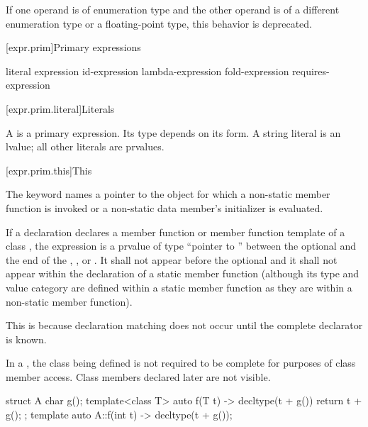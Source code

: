 \pnum
If one operand is of enumeration type
and the other operand is of
a different enumeration type or
a floating-point type,
this behavior is deprecated.

[expr.prim]{Primary expressions}%

\begin{bnf}
\br
    literal\br
    \br
    \terminal{(} expression \terminal{)}\br
    id-expression\br
    lambda-expression\br
    fold-expression\br
    requires-expression
\end{bnf}

[expr.prim.literal]{Literals}

\pnum
A
%
%
is a primary expression.
Its type depends on its form.
A string literal is an lvalue; all other literals are prvalues.

[expr.prim.this]{This}

\pnum
{}%
The keyword  names a pointer to the object for which a non-static member
function is invoked or a non-static data member's
initializer is evaluated.

\pnum
If a declaration declares a member function or member function template of a
class , the expression  is a prvalue of type ``pointer to
 '' between the optional
 and the end of the ,
, or . It shall not appear
before the optional  and it shall not appear within
the declaration of a static member function (although its type and value category
are defined within a static member function as they are within a non-static
member function).
\begin{note}
This is because declaration matching does not
occur until the complete declarator is known.
\end{note}
\begin{note}
In a ,
the class being defined is not required to be complete
for purposes of class member access.
Class members declared later are not visible.
\begin{example}
\begin{codeblock}
struct A {
  char g();
  template<class T> auto f(T t) -> decltype(t + g())
    { return t + g(); }
};
template auto A::f(int t) -> decltype(t + g());
\end{codeblock}
\end{example}
\end{note}

